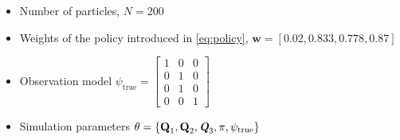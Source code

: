 \begin{itemize}
	\item Number of particles, $ N = 200 $
	\item Weights of the policy introduced in \autoref{eq:policy}, $ \textbf{w} = [0.02, 0.833, 0.778, 0.87] $
	\item Observation model
	$\psi_{\text{true}} =
	\begin{bmatrix}
		1 & 0 & 0 \\
		0 & 1 & 0 \\
		0 & 1 & 0 \\
		0 & 0 & 1
	\end{bmatrix}$
	\item Simulation parameters $  \theta = \left\lbrace  \textbf{Q}_{1}, \textbf{Q}_{2}, \textit{\textbf{Q}}_3, \pi, \psi_{\text{true}} \right\rbrace $
\end{itemize}

